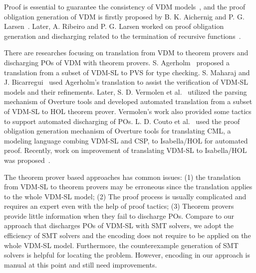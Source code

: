 Proof is essential to guarantee the consistency of VDM models~\cite{978-3-540-19813-0}, and the proof obligation generation of VDM is firstly proposed by B. K. Aichernig and P. G. Larsen~\cite{AL:97:POGV}. Later, A. Ribeiro and P. G. Larsen worked on proof obligation generation and discharging related to the termination of recursive functions~\cite{Ribeiro2010}.

There are researches focusing on translation from VDM to theorem provers and discharging POs of VDM with theorem provers. S. Agerholm~\cite{Agerholm1996} proposed a translation from a subset of VDM-SL to PVS for type checking. S. Maharaj and J. Bicarregui~\cite{632849} used Agerholm's translation to assist the verification of VDM-SL models and their refinements. Later, S. D. Vermolen et al.~\cite{Verm:2007:master,Vermolen:2010:PCV:1774088.1774608} utilized the parsing mechanism of Overture tools and developed automated translation from a subset of VDM-SL to HOL theorem prover. Vermolen's work also provided some tactics to support automated discharging of POs. L. D. Couto et al.~\cite{CFP:14:TVCSAP} used the proof obligation generation mechanism of Overture tools for translating CML, a modeling language combing VDM-SL and CSP, to Isabella/HOL for automated proof. Recently, work on improvement of translating VDM-SL to Isabella/HOL was proposed~\cite{CT:15:EOCGTIS}.

The theorem prover based approaches has common issues: (1) the translation from VDM-SL to theorem provers may be erroneous since the translation applies to the whole VDM-SL model; (2) The proof process is usually complicated and requires an expert even with the help of proof tactics; (3) Theorem provers provide little information when they fail to discharge POs. Compare to our approach that discharges POs of VDM-SL with SMT solvers, we adopt the efficiency of SMT solvers and the encoding does not require to be applied on the whole VDM-SL model. Furthermore, the counterexample generation of SMT solvers is helpful for locating the problem. However, encoding in our approach is manual at this point and still need improvements.

